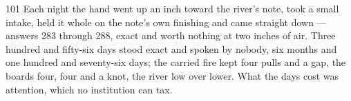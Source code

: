 \begin{CRchronicle}{101}
Each night the hand went up an inch toward the river’s note, took a small intake, held it whole on the note’s own finishing and came straight down --- answers 283 through 288, exact and worth nothing at two inches of air. Three hundred and fifty-six days stood exact and spoken by nobody, six months and one hundred and seventy-six days; the carried fire kept four pulls and a gap, the boards four, four and a knot, the river low over lower. What the days cost was attention, which no institution can tax.
\end{CRchronicle}

